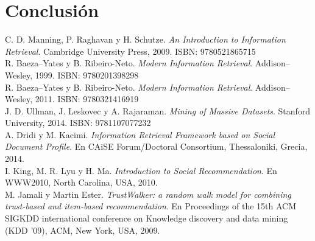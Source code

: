 \documentclass[11pt, spanish]{report}
\begin{document}
	\chapter{Conclusión}
		
	
		
	\begin{thebibliography}{50}
		
  			C. D. Manning, P. Raghavan y H. Schutze.
  			\textit{An Introduction to Information Retrieval}.
  			Cambridge University Press, 
  			2009. ISBN: 9780521865715
  			\\
  		
  			R. Baeza--Yates y B. Ribeiro-Neto.
  			\textit{Modern Information Retrieval}.
  			Addison--Wesley, 
  			1999. ISBN: 9780201398298
  			\\
  			
  			R. Baeza--Yates y B. Ribeiro-Neto.
  			\textit{Modern Information Retrieval}.
  			Addison--Wesley, 
  			2011. ISBN: 9780321416919
  			\\
  		
  			J. D. Ullman, J. Leskovec y A. Rajaraman.
  			\textit{Mining of Massive Datasets}.
  			Stanford University, 
  			2014. ISBN: 9781107077232
  			\\
  			
  			A. Dridi y M. Kacimi. 
  			\textit{Information Retrieval Framework based on Social Document Profile}. 
  			En CAiSE Forum/Doctoral Consortium, Thessaloniki, Grecia, 2014.
  			\\
  		
  			I. King, M. R. Lyu y H. Ma. 
  			\textit{Introduction to Social Recommendation}. 
  			En WWW2010, North Carolina, USA, 2010.
  			\\

  			M. Jamali y Martin Ester. 
  			\textit{TrustWalker: a random walk model for combining trust-based and item-based recommendation}. 
  			En Proceedings of the 15th ACM SIGKDD international conference on Knowledge discovery and data mining (KDD '09), ACM, New York, USA, 2009.
  			\\
  			

\end{thebibliography}
\end{document}
